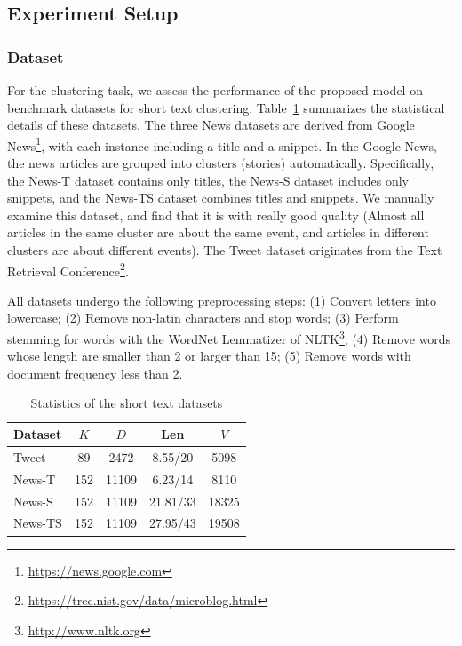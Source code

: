 \subsection{Experiment Setup}
\subsubsection{Dataset}
For the clustering task, we assess the performance of the proposed model on benchmark datasets for short text clustering. Table~\ref{tab:text_stats} summarizes the statistical details of these datasets.
The three News datasets are derived from Google News\footnote{\url{https://news.google.com}}, with each instance including a title and a snippet. In the Google News, the news articles are grouped into clusters (stories) automatically. Specifically, the News-T dataset contains only titles, the News-S dataset includes only snippets, and the News-TS dataset combines titles and snippets. We manually examine this dataset, and find that it is with really good quality (Almost all articles in the same cluster are about the same event, and articles in different clusters are about different events). The Tweet dataset originates from the Text Retrieval Conference\footnote{\url{https://trec.nist.gov/data/microblog.html}}. 

All datasets undergo the following preprocessing steps: (1) Convert letters into lowercase; (2) Remove non-latin characters and stop words; (3) Perform stemming for words with the WordNet Lemmatizer of NLTK\footnote{\url{http://www.nltk.org}}; (4) Remove words whose length are smaller than 2 or larger than 15; (5) Remove words with document frequency less than 2.

\begin{table}[h]
\centering
\renewcommand{\arraystretch}{1.2} %
\caption{Statistics of the short text datasets}
\label{tab:text_stats}
\begin{tabular}{lcccc}
\hline
\textbf{Dataset} & \boldmath$K$ & \boldmath$D$ & \textbf{Len} & \boldmath$V$ \\ \hline
Tweet   & 89  & 2472  & 8.55/20   & 5098   \\
News-T  & 152 & 11109 & 6.23/14   & 8110   \\
News-S  & 152 & 11109 & 21.81/33  & 18325  \\
News-TS & 152 & 11109 & 27.95/43  & 19508  \\ \hline
\end{tabular}
\end{table}

